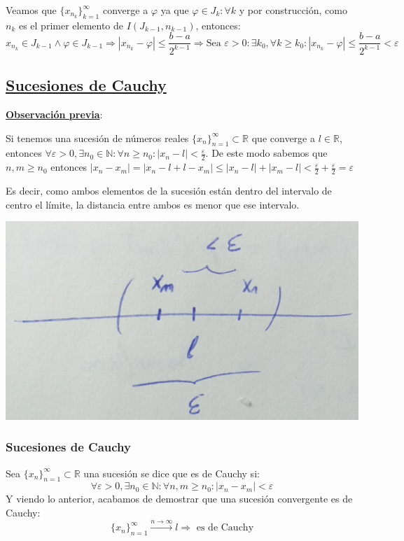 \documentclass[10pt,a4paper,openright]{book}
\begin{document}
Veamos que $\{x_{n_k}\}_{k=1}^\infty$ converge a $\varphi$ ya que $\varphi\in J_k: \forall k$ y por construcción, como $n_k$ es el primer elemento de $I(J_{k-1},n_{k-1})$, entonces:
$$x_{n_k}\in J_{k-1}\wedge \varphi\in J_{k-1}\Rightarrow \left|x_{n_k}-\varphi\right|\leq \frac{b-a}{2^{k-1}}\Rightarrow \mbox{Sea }\varepsilon>0:\exists k_0, \forall k\geq k_0 : \left|x_{n_k}-\varphi\right|\leq \frac{b-a}{2^{k-1}}<\varepsilon$$

\subsection*{\underline{Sucesiones de Cauchy}}
\textbf{\underline{Observación previa}}:\par
Si tenemos una sucesión de números reales $\{x_n\}_{n=1}^\infty\subset \mathbb R$ que converge a $l\in \mathbb R$, entonces $\forall \varepsilon>0, \exists n_0\in \mathbb N: \forall n\geq n_0: |x_n-l|<\frac{\varepsilon}{2}$. De este modo sabemos que $n,m\geq n_0$ entonces $|x_n-x_m|=|x_n-l+l-x_m|\leq |x_n-l|+|x_m-l|< \frac{\varepsilon}{2}+\frac{\varepsilon}{2}=\varepsilon$

Es decir, como ambos elementos de la sucesión están dentro del intervalo de centro el límite, la distancia entre ambos es menor que ese intervalo.

\begin{center}
\includegraphics[scale=0.15]{Cauchy 1}
\end{center}

\subsubsection*{Sucesiones de Cauchy}
Sea $\{x_n\}_{n=1}^\infty\subset \mathbb R$ una sucesión se dice que es de Cauchy si:
$$\forall \varepsilon>0, \exists n_0\in \mathbb N: \forall n,m\geq n_0: |x_n-x_m|<\varepsilon$$
Y viendo lo anterior, acabamos de demostrar que una sucesión convergente es de Cauchy:
$$\{x_n\}_{n=1}^\infty\xrightarrow{n\rightarrow \infty} l\Rightarrow \mbox{ es de Cauchy}$$
\end{document}
